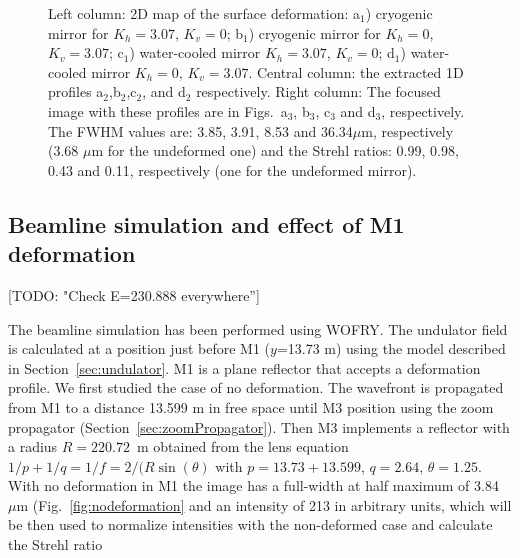 \documentclass{iucr}              %
\newcommand{\todo}[1]{{\color{red}[TODO: "#1'']}}
\begin{document}
\begin{figure}
\begin{center}
\begin{tabular}{l}
   \end{tabular}
  \end{center}
   \caption
   { 
   Left column: 2D map of the surface deformation: a$_1$) cryogenic mirror for $K_h=3.07$, $K_v=0$; b$_1$) cryogenic mirror for $K_h=0$, $K_v=3.07$; c$_1$) water-cooled mirror $K_h=3.07$, $K_v=0$; d$_1$) water-cooled mirror $K_h=0$, $K_v=3.07$. Central column: the extracted 1D profiles a$_2$,b$_2$,c$_2$, and d$_2$ respectively. Right column: The focused image with these profiles are in Figs.~a$_3$, b$_3$, c$_3$ and d$_3$, respectively. 
   The FWHM values are: 3.85, 3.91, 8.53 and 36.34$\mu$m, respectively (3.68 $\mu$m for the undeformed one) and the Strehl ratios: 0.99, 0.98, 0.43 and 0.11, respectively (one for the undeformed mirror).
   }
   \end{figure} 


\subsection{Beamline simulation and effect of M1 deformation}

\todo{Check E=230.888 everywhere} 

The beamline simulation has been performed using WOFRY. The undulator field is calculated at a position just before M1 ($y$=13.73 m) using the model described in Section~\ref{sec:undulator}. M1 is a plane reflector that accepts a deformation profile. We first studied the case of no deformation. The wavefront is propagated from M1 to a distance 13.599 m in free space until M3 position using the zoom propagator (Section~\ref{sec:zoomPropagator}). Then M3 implements a reflector with a radius $R=220.72$~m obtained from the lens equation $1/p + 1/q=1/f=2/(R \sin(\theta)$ with $p=13.73+13.599$, $q=2.64$, $\theta=1.25$\textdegree. With no deformation in M1 the image has a full-width at half maximum of 3.84 $\mu$m (Fig.~\ref{fig:nodeformation} and an intensity of 213 in arbitrary units, which will be then used to normalize intensities with the non-deformed case and calculate the Strehl ratio
\end{document}

